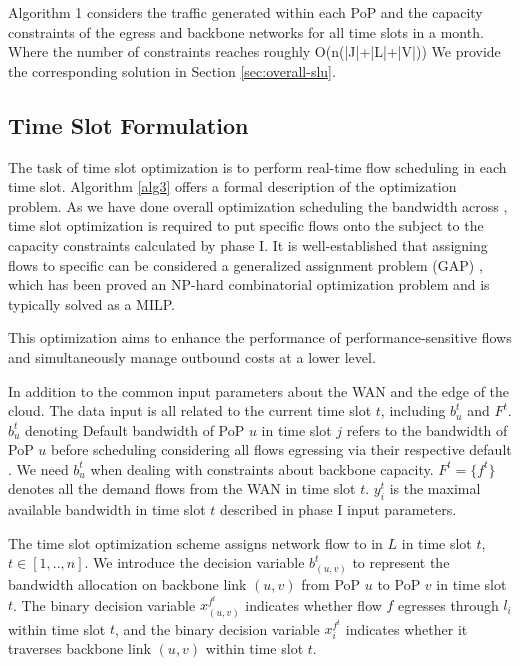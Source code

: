 Algorithm 1 considers the traffic generated within each PoP and the capacity constraints of the egress and backbone networks for all time slots in a month. Where the number of constraints reaches roughly O(n(|J|+|L|+|V|))
We provide the corresponding solution in Section \ref{sec:overall-slu}.

\subsection{Time Slot Formulation}  \label{sec:timeslot-opt}

The task of time slot optimization is to perform real-time flow scheduling in each time slot. Algorithm \ref{alg3} offers a formal description of the optimization problem. As we have done overall optimization scheduling the bandwidth across {\egresses}, time slot optimization is required to put specific flows onto the {\egresses} subject to the capacity constraints calculated by phase I. It is well-established that assigning flows to specific {\egresses} can be considered a generalized assignment problem (GAP) \cite{shmoys1993approximationGAP}, which has been proved an NP-hard combinatorial optimization problem and is typically solved as a MILP.

This optimization aims to enhance the performance of performance-sensitive flows and simultaneously manage outbound costs at a lower level. 

{In addition to the common input parameters about the WAN and the edge of the cloud. The data input is all related to the current time slot $t$, including $b^t_{u}$ and $F^t$. $b^t_{u}$ denoting Default bandwidth of PoP $u$ in time slot $j$ refers to the bandwidth of PoP $u$ before scheduling considering all flows egressing via their respective default {\egress}. We need $b^t_{u}$ when dealing with constraints about backbone capacity. $F^t=\{f^t\}$ denotes all the demand flows from the WAN in time slot $t$. $y^t_i$ is the maximal available bandwidth in time slot $t$ described in phase I input parameters.}


 The time slot optimization scheme assigns network flow to {\egresses} in $L$ in time slot $t$, $t\in[1,..,n]$. We introduce the decision variable $b^t_{(u,v)}$ to represent the bandwidth allocation on backbone link $(u,v)$ from PoP $u$ to PoP $v$ in time slot $t$. The binary decision variable $x_{(u,v)}^{f^{t}}$ indicates whether flow $f$ egresses through {\egress} $l_i$ within time slot $t$, and the binary decision variable $x_i^{f^{t}}$ indicates whether it traverses backbone link $(u,v)$ within time slot $t$.





